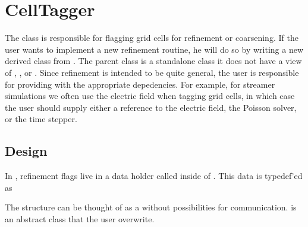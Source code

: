 \documentclass[letterpaper,10pt,english]{sphinxmanual}
\begin{document}
\section{CellTagger}
\label{\detokenize{Source/CellTagger:celltagger}}\label{\detokenize{Source/CellTagger:chap-celltagger}}\label{\detokenize{Source/CellTagger::doc}}
\sphinxAtStartPar
The  class is responsible for flagging grid cells for refinement or coarsening.
If the user wants to implement a new refinement routine, he will do so by writing a new derived class from .
The  parent class is a stand\sphinxhyphen{}alone class \sphinxhyphen{} it does not have a view of , , or .
Since refinement is intended to be quite general, the user is responsible for providing  with the appropriate depedencies.
For example, for streamer simulations we often use the electric field when tagging grid cells, in which case the user should supply either a reference to the electric field, the Poisson solver, or the time stepper.


\subsection{Design}
\label{\detokenize{Source/CellTagger:design}}
\sphinxAtStartPar
In , refinement flags live in a data holder called  inside of .
This data is typedef’ed as

\begin{sphinxVerbatim}[commandchars=\\\{\},formatcom=\scriptsize]
    
\end{sphinxVerbatim}

\sphinxAtStartPar
The  structure can be thought of as a  without possibilities for communication.
 is an abstract class that the user  overwrite.
\end{document}
